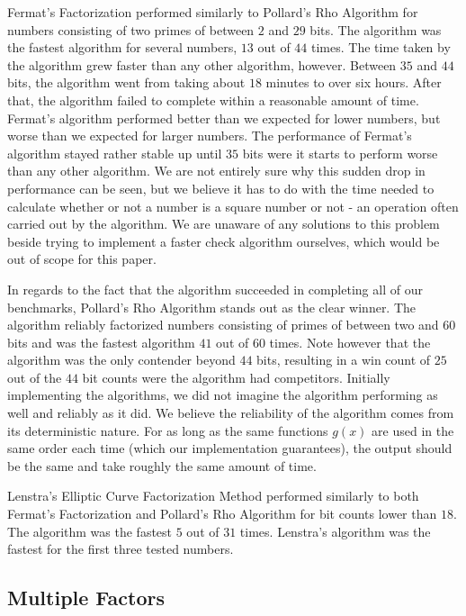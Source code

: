Fermat's Factorization performed similarly to Pollard's Rho Algorithm for numbers consisting of two primes of between $2$ and $29$ bits. The algorithm was the fastest algorithm for several numbers, $13$ out of $44$ times. The time taken by the algorithm grew faster than any other algorithm, however. Between $35$ and $44$ bits, the algorithm went from taking about $18$ minutes to over six hours. After that, the algorithm failed to complete within a reasonable amount of time. Fermat's algorithm performed better than we expected for lower numbers, but worse than we expected for larger numbers. The performance of Fermat's algorithm stayed rather stable up until $35$ bits were it starts to perform worse than any other algorithm. We are not entirely sure why this sudden drop in performance can be seen, but we believe it has to do with the time needed to calculate whether or not a number is a square number or not - an operation often carried out by the algorithm. We are unaware of any solutions to this problem beside trying to implement a faster check algorithm ourselves, which would be out of scope for this paper.

In regards to the fact that the algorithm succeeded in completing all of our benchmarks, Pollard's Rho Algorithm stands out as the clear winner. The algorithm reliably factorized numbers consisting of primes of between two and $60$ bits and was the fastest algorithm $41$ out of $60$ times. Note however that the algorithm was the only contender beyond $44$ bits, resulting in a win count of $25$ out of the $44$ bit counts were the algorithm had competitors. Initially implementing the algorithms, we did not imagine the algorithm performing as well and reliably as it did. We believe the reliability of the algorithm comes from its deterministic nature. For as long as the same functions $g(x)$ are used in the same order each time (which our implementation guarantees), the output should be the same and take roughly the same amount of time.

Lenstra's Elliptic Curve Factorization Method performed similarly to both Fermat's Factorization and Pollard's Rho Algorithm for bit counts lower than $18$. The algorithm was the fastest $5$ out of $31$ times. Lenstra's algorithm was the fastest for the first three tested numbers.

\subsection{Multiple Factors}

